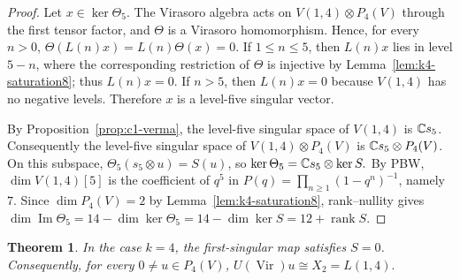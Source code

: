 \documentclass[10pt,a4paper]{amsart}
\numberwithin{equation}{section} \newtheorem{thm}{Theorem}[section] \newtheorem{lem}[thm]{Lemma} \newtheorem{ex}[thm]{Example} \newtheorem{prop}[thm]{Proposition} \newtheorem{cor}[thm]{Corollary} \newtheorem{defi}[thm]{Definition} \newtheorem{rmk}[thm]{Remark} \newtheorem{notation}[thm]{Notation}
\newcommand{\Vir}{\operatorname{Vir}}
\begin{document}
\begin{proof}
Let $x\in\ker\Theta_5$. The Virasoro algebra acts on $V(1,4)\otimes P_4(V)$ through the first tensor factor, and $\Theta$ is a Virasoro homomorphism. Hence, for every $n>0$, \(\Theta(L(n)x)=L(n)\Theta(x)=0\). If $1\le n\le5$, then $L(n)x$ lies in level $5-n$, where the corresponding restriction of $\Theta$ is injective by Lemma~\ref{lem:k4-saturation8}; thus $L(n)x=0$. If $n>5$, then $L(n)x=0$ because $V(1,4)$ has no negative levels. Therefore $x$ is a level-five singular vector.

By Proposition~\ref{prop:c1-verma}, the level-five singular space of $V(1,4)$ is $\mathbb{C} s_5$. Consequently the level-five singular space of $V(1,4)\otimes P_4(V)$ is \(\mathbb{C} s_5\otimes P_4(V)\). On this subspace, \(\Theta_5(s_5\otimes u)=S(u)\), so \(\ker\Theta_5=\mathbb{C} s_5\otimes\ker S.\) By PBW, $\dim V(1,4)[5]$ is the coefficient of $q^5$ in \(P(q)=\prod_{n\ge1}(1-q^n)^{-1}\), namely $7$. Since $\dim P_4(V)=2$ by Lemma~\ref{lem:k4-saturation8}, rank--nullity gives \(\dim\operatorname{Im}\Theta_5 =14-\dim\ker\Theta_5 =14-\dim\ker S =12+\operatorname{rank}S\).
\end{proof}

\begin{thm}\label{thm:k4-Szero}
In the case $k=4$, the first-singular map satisfies $S=0$. Consequently, for every $0\ne u\in P_4(V)$, \(U(\Vir)u\cong X_2=L(1,4).\)
\end{thm}
\end{document}
